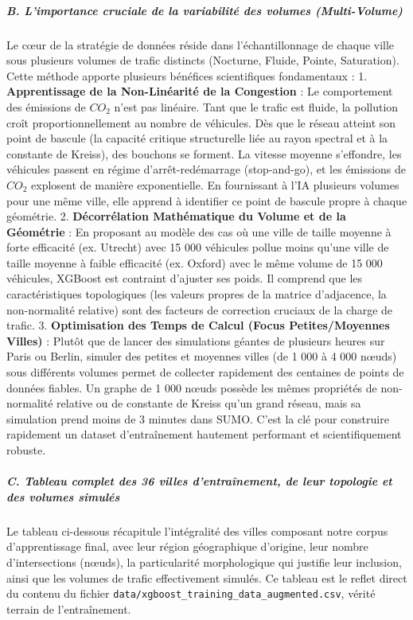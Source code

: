 \documentclass[10pt, a4paper]{article}
\begin{document}
\subparagraph{B. L'importance cruciale de la variabilité des volumes
(Multi-Volume)}\label{b.-limportance-cruciale-de-la-variabilituxe9-des-volumes-multi-volume}

Le cœur de la stratégie de données réside dans l'échantillonnage de
chaque ville sous plusieurs volumes de trafic distincts (Nocturne,
Fluide, Pointe, Saturation). Cette méthode apporte plusieurs bénéfices
scientifiques fondamentaux : 1. \textbf{Apprentissage de la
Non-Linéarité de la Congestion} : Le comportement des émissions de
\(CO_2\) n'est pas linéaire. Tant que le trafic est fluide, la pollution
croît proportionnellement au nombre de véhicules. Dès que le réseau
atteint son point de bascule (la capacité critique structurelle liée au
rayon spectral et à la constante de Kreiss), des bouchons se forment. La
vitesse moyenne s'effondre, les véhicules passent en régime
d'arrêt-redémarrage (stop-and-go), et les émissions de \(CO_2\)
explosent de manière exponentielle. En fournissant à l'IA plusieurs
volumes pour une même ville, elle apprend à identifier ce point de
bascule propre à chaque géométrie. 2. \textbf{Décorrélation Mathématique
du Volume et de la Géométrie} : En proposant au modèle des cas où une
ville de taille moyenne à forte efficacité (ex. Utrecht) avec 15 000
véhicules pollue moins qu'une ville de taille moyenne à faible
efficacité (ex. Oxford) avec le même volume de 15 000 véhicules, XGBoost
est contraint d'ajuster ses poids. Il comprend que les caractéristiques
topologiques (les valeurs propres de la matrice d'adjacence, la
non-normalité relative) sont des facteurs de correction cruciaux de la
charge de trafic. 3. \textbf{Optimisation des Temps de Calcul (Focus
Petites/Moyennes Villes)} : Plutôt que de lancer des simulations géantes
de plusieurs heures sur Paris ou Berlin, simuler des petites et moyennes
villes (de 1 000 à 4 000 nœuds) sous différents volumes permet de
collecter rapidement des centaines de points de données fiables. Un
graphe de 1 000 nœuds possède les mêmes propriétés de non-normalité
relative ou de constante de Kreiss qu'un grand réseau, mais sa
simulation prend moins de 3 minutes dans SUMO. C'est la clé pour
construire rapidement un dataset d'entraînement hautement performant et
scientifiquement robuste.

\subparagraph{C. Tableau complet des 36 villes d'entraînement, de leur
topologie et des volumes
simulés}\label{c.-tableau-complet-des-36-villes-dentrauxeenement-de-leur-topologie-et-des-volumes-simuluxe9s}

Le tableau ci-dessous récapitule l'intégralité des villes composant
notre corpus d'apprentissage final, avec leur région géographique
d'origine, leur nombre d'intersections (nœuds), la particularité
morphologique qui justifie leur inclusion, ainsi que les volumes de
trafic effectivement simulés. Ce tableau est le reflet direct du contenu
du fichier \texttt{data/xgboost\_training\_data\_augmented.csv}, vérité
terrain de l'entraînement.
\end{document}
